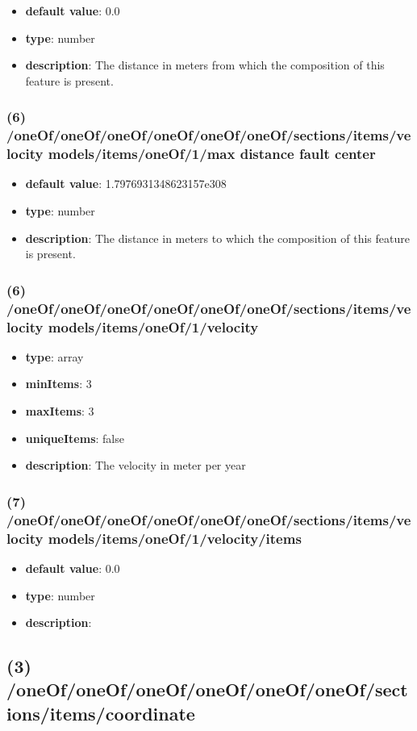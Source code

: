 \begin{itemize}[leftmargin=6em]\item {\bf default value}: 0.0
\item {\bf type}: number
\item {\bf description}: The distance in meters from which the composition of this feature is present.
\end{itemize}\subsubsection{(6) /oneOf/oneOf/oneOf/oneOf/oneOf/oneOf/sections/items/velocity models/items/oneOf/1/max distance fault center}
\begin{itemize}[leftmargin=6em]\item {\bf default value}: 1.7976931348623157e308
\item {\bf type}: number
\item {\bf description}: The distance in meters to which the composition of this feature is present.
\end{itemize}\subsubsection{(6) /oneOf/oneOf/oneOf/oneOf/oneOf/oneOf/sections/items/velocity models/items/oneOf/1/velocity}
\begin{itemize}[leftmargin=6em]\item {\bf type}: array
\item {\bf minItems}: 3
\item {\bf maxItems}: 3
\item {\bf uniqueItems}: false
\item {\bf description}: The velocity in meter per year
\end{itemize}\subsubsection{(7) /oneOf/oneOf/oneOf/oneOf/oneOf/oneOf/sections/items/velocity models/items/oneOf/1/velocity/items}
\begin{itemize}[leftmargin=7em]\item {\bf default value}: 0.0
\item {\bf type}: number
\item {\bf description}: 
\end{itemize}\subsection{(3) /oneOf/oneOf/oneOf/oneOf/oneOf/oneOf/sections/items/coordinate}

